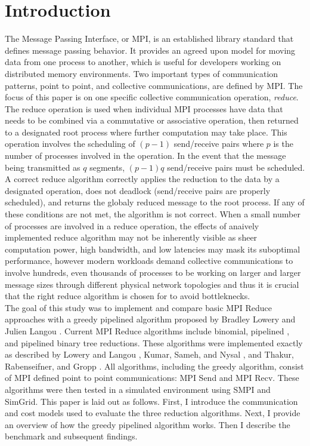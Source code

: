 \documentclass{article}
\begin{document}
\section{Introduction}
The Message Passing Interface, or MPI, is an established library standard that defines message
passing behavior. It provides an agreed upon model for moving data from one process to another, which
is useful for developers working on distributed memory environments. Two important types of 
communication patterns, point to point, and collective communications, are defined by MPI. The focus
of this paper is on one specific collective communication operation, \textit{reduce}. The reduce 
operation is used when individual MPI processes have data that needs to be combined via a commutative
or associative operation, then returned to a designated root process where further computation may 
take place. This operation involves the scheduling of $(p-1)$ send/receive pairs where $p$ is the 
number of processes involved in the operation. In the event that the message being transmitted as $q$
segments, $(p-1)q$ send/receive pairs must be scheduled. A correct reduce algorithm correctly 
applies the reduction to the data by a designated operation, does not deadlock (send/receive pairs
are properly scheduled), and returns the globaly reduced message to the root process. If any of 
these conditions are not met, the algorithm is not correct. When a small number of processes are 
involved in a reduce operation, the effects of anaively implemented reduce algorithm may not be 
inherently visible as sheer computation power, high bandwidth, and low latencies may mask its 
suboptimal performance, however modern workloads demand collective communications to involve 
hundreds, even thousands of processes to be working on larger and larger message sizes through 
different physical network topologies and thus it is crucial that the right reduce algorithm is 
chosen for to avoid bottleknecks.\\    

The goal of this study was to implement and compare basic MPI Reduce approaches with a
greedy pipelined algorithm proposed by Bradley Lowery and Julien Langou \cite{Lowery-13}. Current 
MPI Reduce algorithms include binomial, pipelined , and pipelined binary tree 
reductions. These algorithms were implemented exactly as described by Lowery and Langou 
\cite{Lowery-13}, Kumar, Sameh, and Nysal \cite{Kumar-16}, and Thakur, Rabenseifner, and Gropp
\cite{Thakur-05}. All algorithms, including the greedy algorithm, consist of MPI defined point to 
point communications: MPI Send and MPI Recv. These algorithms were then tested in a simulated 
environment using SMPI and SimGrid. This paper is laid out as follows. First, I introduce the 
communication and cost models used to evaluate the three reduction algorithms. Next, I provide an 
overview of how the greedy pipelined algorithm works. Then I describe the benchmark and subsequent 
findings.
\end{document}
